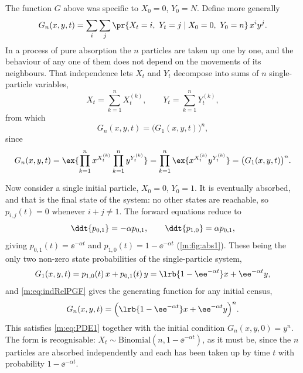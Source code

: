 The function $G$ above was specific to $X_0=0$, $Y_0=N$. Define more generally
\begin{equation*}
G_n(x,y,t) = \sum_i\sum_j\pr{X_t=i,\ Y_t=j \mid X_0=0,\ Y_0=n}\,x^iy^j .
\end{equation*}
In a process of pure absorption the $n$ particles are taken up one by one, and the
behaviour of any one of them does not depend on the movements of its neighbours.
That independence lets $X_t$ and $Y_t$ decompose into sums of $n$ single-particle
variables,
\begin{equation*}
X_t = \sum_{k=1}^{n}X_t^{(k)},
\qquad
Y_t = \sum_{k=1}^{n}Y_t^{(k)},
\end{equation*}
from which
\begin{equation}
\label{m:eq:indRelPGF}
G_n(x,y,t) = \bigl(G_1(x,y,t)\bigr)^n ,
\end{equation}
since
\begin{equation*}
G_n(x,y,t)
= \ex{\prod_{k=1}^{n}x^{X_t^{(k)}}\prod_{k=1}^{n}y^{Y_t^{(k)}}}
= \prod_{k=1}^{n}\ex{x^{X_t^{(k)}}y^{Y_t^{(k)}}}
= \bigl(G_1(x,y,t)\bigr)^n .
\end{equation*}

Now consider a single initial particle, $X_0=0$, $Y_0=1$. It is eventually
absorbed, and that is the final state of the system: no other states are reachable,
so $p_{i,j}(t)=0$ whenever $i+j\neq1$. The forward equations reduce to
\begin{equation*}
\ddt{p_{0,1}} = -\alpha p_{0,1},
\qquad
\ddt{p_{1,0}} = \alpha p_{0,1},
\end{equation*}
giving $p_{0,1}(t) = \ee^{-\alpha t}$ and $p_{1,0}(t) = 1-\ee^{-\alpha t}$
(\cref{m:fig:abs1}). These being the only two non-zero state probabilities of the
single-particle system,
\begin{equation*}
G_1(x,y,t) = p_{1,0}(t)\,x + p_{0,1}(t)\,y
= \lrb{1-\ee^{-\alpha t}}x + \ee^{-\alpha t}y ,
\end{equation*}
and \cref{m:eq:indRelPGF} gives the generating function for any initial census,
\begin{equation}
\label{m:eq:Gabsonly}
G_n(x,y,t) = \Bigl(\lrb{1-\ee^{-\alpha t}}x + \ee^{-\alpha t}y\Bigr)^n .
\end{equation}
This satisfies \cref{m:eq:PDE1} together with the initial condition
$G_n(x,y,0)=y^n$. The form is recognisable: $X_t\sim\text{Binomial}(n,1-\ee^{-\alpha t})$,
as it must be, since the $n$ particles are absorbed independently and each has been
taken up by time $t$ with probability $1-\ee^{-\alpha t}$.


